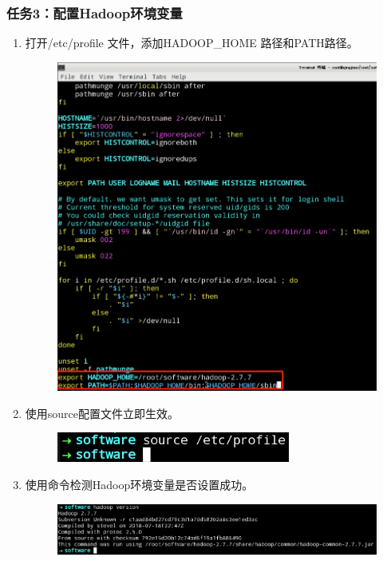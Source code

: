 \documentclass {article}
\begin{document}
			\subsubsection{任务3：配置Hadoop环境变量}
				\begin{enumerate}
					\item 打开/etc/profile 文件，添加HADOOP\_HOME 路径和PATH路径。
					\begin{figure}[H]
						\centering
						\includegraphics[width=4.5in]{figures/fig25.png}
					\end{figure}
				
					\item 使用source配置文件立即生效。
					\begin{figure}[H]
						\centering
						\includegraphics{figures/fig26.png}
					\end{figure}
				
					\item 使用命令检测Hadoop环境变量是否设置成功。
					\begin{figure}[H]
						\centering
						\includegraphics[width=4.5in]{figures/fig27.png}
					\end{figure}
				\end{enumerate}
				
\end{document}
